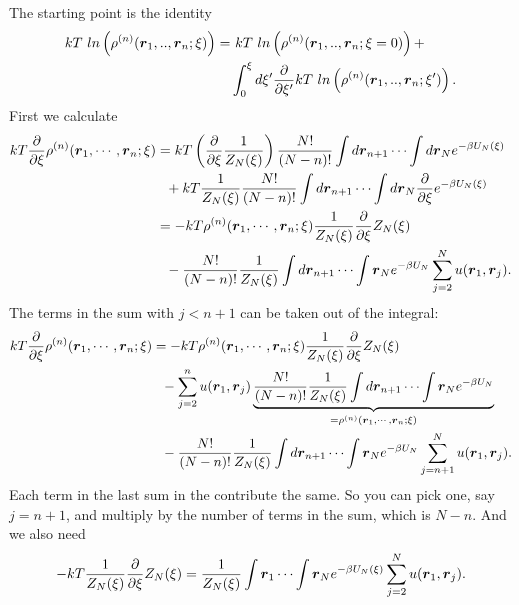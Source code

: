 The starting point is the identity
\begin{align}\label{eq:kirkwood:start}
kT~ln\left(\rho^{(n)}(\boldsymbol{r}_1,..,\boldsymbol{r}_n;\xi)\right) =
&~ kT~ln\left(\rho^{(n)}(\boldsymbol{r}_1,..,\boldsymbol{r}_n;\xi=0)\right) + \nonumber \\
& \int_0^\xi d\xi' \frac{\partial}{\partial \xi'}
kT~ln\left(\rho^{(n)}(\boldsymbol{r}_1,..,\boldsymbol{r}_n;\xi')\right).
\end{align}
First we calculate
\begin{align}
kT\frac{\partial}{\partial \xi}
    \rho^{(n)}(\boldsymbol{r}_1,\cdots,\boldsymbol{r}_n;\xi) &=
kT\left( \frac{\partial}{\partial \xi}\frac{1}{Z_N(\xi)} \right)
    \frac{N!}{(N-n)!}
    \int d\boldsymbol{r}_{n+1} \cdots \int d\boldsymbol{r}_N e^{-\beta U_N(\xi)}
        \nonumber \\
&~~+ kT\frac{1}{Z_N(\xi)} \frac{N!}{(N-n)!}
    \int d\boldsymbol{r}_{n+1} \cdots \int d\boldsymbol{r}_N 
    \frac{\partial}{\partial \xi} e^{-\beta U_N(\xi)}
        \nonumber \\
&= -kT\rho^{(n)}(\boldsymbol{r}_1,\cdots,\boldsymbol{r}_n;\xi)
        \frac{1}{Z_N(\xi)} \frac{\partial}{\partial \xi}
            Z_N(\xi)
        \nonumber \\
    &~~-\frac{N!}{(N-n)!} \frac{1}{Z_N(\xi)}
        \int d\boldsymbol{r}_{n+1} \cdots \int \boldsymbol{r}_N e^{-\beta U_N}
        \sum_{j=2}^{N} u(\boldsymbol{r}_1,\boldsymbol{r}_j).
    \nonumber 
\end{align}
The terms in the sum with $j<n+1$ can be taken out of the integral:
\begin{align} \label{eq:kirkwood:int1}
kT\frac{\partial}{\partial \xi}
    \rho^{(n)}(\boldsymbol{r}_1,\cdots,\boldsymbol{r}_n;\xi)
&= -kT\rho^{(n)}(\boldsymbol{r}_1,\cdots,\boldsymbol{r}_n;\xi)
        \frac{1}{Z_N(\xi)} \frac{\partial}{\partial \xi}
        Z_N(\xi) \nonumber \\
    &~~- \sum_{j=2}^{n} u(\boldsymbol{r}_1,\boldsymbol{r}_j)
        \underbrace{
        \frac{N!}{(N-n)!} \frac{1}{Z_N(\xi)}
        \int d\boldsymbol{r}_{n+1} \cdots \int \boldsymbol{r}_N e^{-\beta U_N}
        }_{= \rho^{(n)}(\boldsymbol{r}_1,\cdots,\boldsymbol{r}_n;\xi)}
        \nonumber \\
    &~~-\frac{N!}{(N-n)!} \frac{1}{Z_N(\xi)}
        \int d\boldsymbol{r}_{n+1} \cdots \int \boldsymbol{r}_N e^{-\beta U_N}
        \sum_{j=n+1}^{N} u(\boldsymbol{r}_1,\boldsymbol{r}_j).
\end{align}
Each term in the last sum in the contribute the same.
So you can pick one, say $j=n+1$, and multiply by the number
of terms in the sum, which is $N-n$.
And we also need
\begin{align}
-kT\frac{1}{Z_N(\xi)} \frac{\partial}{\partial \xi} Z_N(\xi)
= \frac{1}{Z_N(\xi)}
    \int \boldsymbol{r}_1 \cdots \int \boldsymbol{r}_N e^{-\beta U_N(\xi)}
       \sum_{j=2}^N u(\boldsymbol{r}_1,\boldsymbol{r}_j). 
\nonumber
\end{align}
